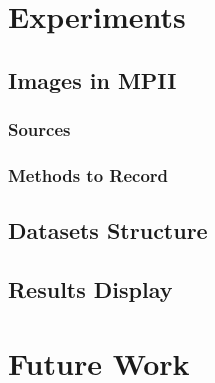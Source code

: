 \documentclass[senior]{IPSstyle}
\begin{document}
\chapter{Experiments} \label{experiments}
\section{Images in MPII}
\subsection{Sources}
\subsection{Methods to Record}
\section{Datasets Structure}
\section{Results Display}

\chapter{Future Work}\label{future work}



\end{document}
